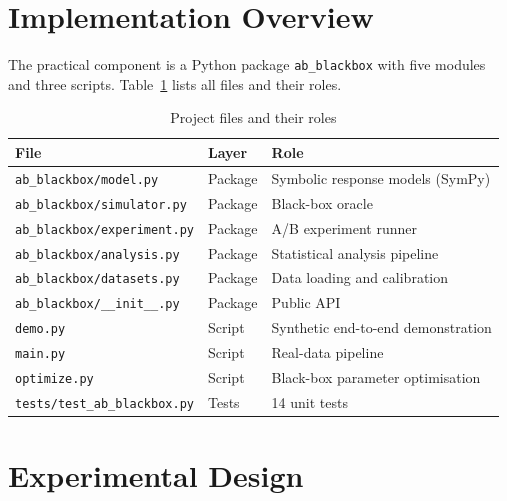 \documentclass[a4paper,12pt]{extarticle}
\numberwithin{equation}{section}
\begin{document}
\clearpage

\section*{Implementation Overview}

The practical component is a Python package \texttt{ab\_blackbox} with five
modules and three scripts. Table~\ref{tab:files} lists all files and their
roles.

\begin{table}[ht]
\centering
\caption{Project files and their roles}
\label{tab:files}
\begin{tabular}{lll}
\toprule
\textbf{File} & \textbf{Layer} & \textbf{Role} \\
\midrule
\texttt{ab\_blackbox/model.py}        & Package & Symbolic response models (SymPy) \\
\texttt{ab\_blackbox/simulator.py}    & Package & Black-box oracle \\
\texttt{ab\_blackbox/experiment.py}   & Package & A/B experiment runner \\
\texttt{ab\_blackbox/analysis.py}     & Package & Statistical analysis pipeline \\
\texttt{ab\_blackbox/datasets.py}     & Package & Data loading and calibration \\
\texttt{ab\_blackbox/\_\_init\_\_.py} & Package & Public API \\
\texttt{demo.py}                      & Script  & Synthetic end-to-end demonstration \\
\texttt{main.py}                      & Script  & Real-data pipeline \\
\texttt{optimize.py}                  & Script  & Black-box parameter optimisation \\
\texttt{tests/test\_ab\_blackbox.py}  & Tests   & 14 unit tests \\
\bottomrule
\end{tabular}
\end{table}

\clearpage

\section{Experimental Design}
\end{document}

